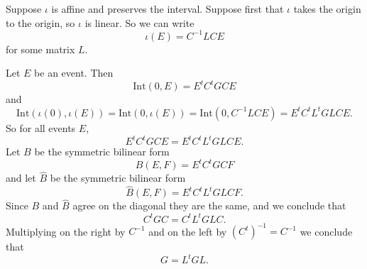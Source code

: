 \documentclass[minion]{homework}
\def\Int{\mathrm{Int}}
\begin{document}
\begin{aproblems}
\solution
Suppose $\iota$ is affine and preserves the interval. Suppose first that $\iota$ takes the origin
to the origin, so $\iota$ is linear. So we can write
\begin{equation}
\iota( E) = C^{-1} L C E
\end{equation}
for some matrix $L$.

Let $E$ be an event.  Then
\begin{equation}
\Int(0,E) = E^t C^t G C E
\end{equation}
and
\begin{equation}
\Int(\iota(0),\iota(E)) = \Int(0,\iota(E)) =  \Int(0,C^{-1} L C E) = E^t C^t L^t G  L C E.
\end{equation}
So for all events $E$,
\begin{equation}
E^t C^t G C E = E^t C^t L^t G  L C E.
\end{equation}
Let $B$ be the symmetric bilinear form
\begin{equation}
B(E,F) = E^t C^t G  C F
\end{equation}
and let $\hat B$ be the symmetric bilinear form
\begin{equation}
\hat B(E,F) = E^t C^t L^t G  L C F.
\end{equation}
Since $B$ and $\hat B$ agree on the diagonal they are the same, and we conclude that
\begin{equation}
C^t G  C = C^t L^t G  L C.
\end{equation}
Multiplying on the right by $C^{-1}$ and on the left by $(C^t)^{-1} = C^{-1}$ we conclude that
\begin{equation}
G = L^t G  L.
\end{equation}


\end{aproblems}
\end{document}

